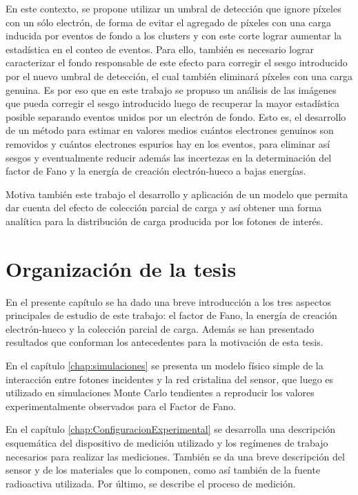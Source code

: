 En este contexto, se propone utilizar un umbral de detección que ignore píxeles con un sólo electrón, de forma de evitar el agregado de píxeles con una carga inducida por eventos de fondo a los clusters y con este corte lograr aumentar la estadística en el conteo de eventos. Para ello, también es necesario lograr caracterizar el fondo responsable de este efecto para corregir el sesgo introducido por el nuevo umbral de detección, el cual también eliminará píxeles con una carga genuina.
%
Es por eso que en este trabajo se propuso un análisis de las imágenes que pueda corregir el sesgo introducido luego de recuperar la mayor estadística posible separando eventos unidos por un electrón de fondo. 
Esto es, el desarrollo de un método para estimar en valores medios cuántos electrones genuinos son removidos y cuántos electrones espurios hay en los eventos, para eliminar así sesgos y eventualmente reducir además las incertezas en la determinación del factor de Fano y la energía de creación electrón-hueco a bajas energías.

Motiva también este trabajo el desarrollo y aplicación de un modelo que permita dar cuenta del efecto de colección parcial de carga y así obtener una forma analítica para la distribución de carga producida por los fotones de interés.

\section{Organización de la tesis}
\noindent En el presente capítulo se ha dado una breve introducción a los tres aspectos principales de estudio de este trabajo: el factor de Fano, la energía de creación electrón-hueco y la colección parcial de carga. Además se han presentado resultados que conforman los antecedentes para la motivación de esta tesis.

En el capítulo \ref{chap:simulaciones} se presenta un modelo físico simple de la interacción entre fotones incidentes y la red cristalina del sensor, que luego es utilizado en simulaciones Monte Carlo tendientes a reproducir los valores experimentalmente observados para el Factor de Fano.

En el capítulo \ref{chap:ConfiguracionExperimental} se desarrolla una descripción esquemática del dispositivo de medición utilizado y los regímenes de trabajo necesarios para realizar las mediciones. También se da una breve descripción del sensor y de los materiales que lo componen, como así también de la fuente radioactiva utilizada. Por último, se describe el proceso de medición.

